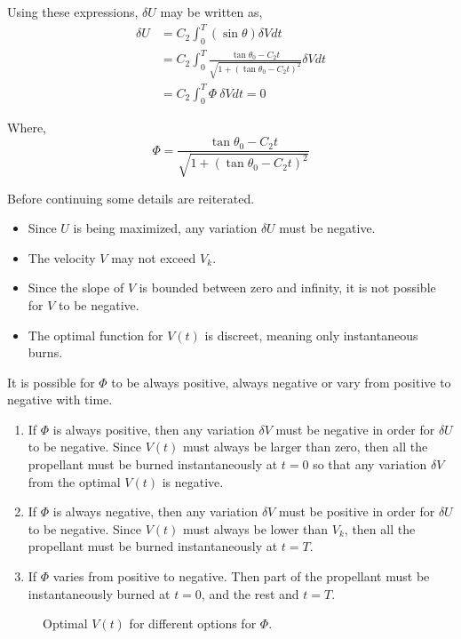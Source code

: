 Using these expressions, $\delta U$ may be written as,
\begin{align}
    \delta U &= C_2 \int_0^T \left(\sin{\theta}\right) \delta V dt \\ 
             &= C_2 \int_0^T \frac{\tan{\theta_0 - C_2t}}{\sqrt{1+\left(\tan{\theta_0 - C_2t}\right)^2}} \delta V dt \\
             &= C_2 \int_0^T \Phi\ \delta V dt = 0 \label{eq:eq:delta_u_int_3}
\end{align}

Where,
\begin{equation}
    \Phi = \frac{\tan{\theta_0 - C_2t}}{\sqrt{1+\left(\tan{\theta_0 - C_2t}\right)^2}}
\end{equation}

Before continuing some details are reiterated.
\begin{itemize}
    \item Since $U$ is being maximized, any variation $\delta U$ must be negative. 
    \item The velocity $V$ may not exceed $V_k$.
    \item Since the slope of $V$ is bounded between zero and infinity, it is not possible for $V$ to be negative.
    \item The optimal function for $V(t)$ is discreet, meaning only instantaneous burns.
\end{itemize}


It is possible for $\Phi$ to be always positive, always negative or vary from positive to negative with time.
\begin{enumerate}
    \item If $\Phi$ is always positive, then any variation $\delta V$ must be negative in order for $\delta U$ to be negative. Since $V(t)$ must always be larger than zero, then all the propellant must be burned instantaneously at $t=0$ so that any variation $\delta V$ from the optimal $V(t)$ is negative.
    \item If $\Phi$ is always negative, then any variation $\delta V$ must be positive in order for $\delta U$ to be negative. Since $V(t)$ must always be lower than $V_k$, then all the propellant must be burned instantaneously at $t=T$.
    \item If $\Phi$ varies from positive to negative. Then part of the propellant must be instantaneously burned at $t=0$, and the rest and $t=T$.
\end{enumerate}


\begin{figure}[ht]			
	\centering
				
	\caption{Optimal $V(t)$ for different options for $\Phi$\cite{thomson2012introduction}.}
	\label{fig:opt_vt}
\end{figure}

